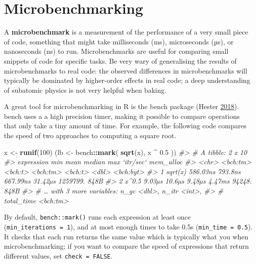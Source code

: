 \documentclass[]{book}
\newenvironment{Shaded}{\begin{snugshade}}{\end{snugshade}}
\newcommand{\CommentTok}[1]{\textcolor[rgb]{0.37,0.37,0.37}{\textit{#1}}}
\newcommand{\DecValTok}[1]{\textcolor[rgb]{0.06,0.06,0.06}{#1}}
\newcommand{\FloatTok}[1]{\textcolor[rgb]{0.06,0.06,0.06}{#1}}
\newcommand{\KeywordTok}[1]{\textcolor[rgb]{0.27,0.27,0.27}{\textbf{#1}}}
\newcommand{\NormalTok}[1]{#1}
\newcommand{\OperatorTok}[1]{\textcolor[rgb]{0.43,0.43,0.43}{\textbf{#1}}}
\newcommand{\StringTok}[1]{\textcolor[rgb]{0.5,0.5,0.5}{#1}}
\begin{document}
\hypertarget{microbenchmarking}{%
\section{Microbenchmarking}\label{microbenchmarking}}


A \textbf{microbenchmark} is a measurement of the performance of a very small piece of code, something that might take milliseconds (ms), microseconds (µs), or nanoseconds (ns) to run. Microbenchmarks are useful for comparing small snippets of code for specific tasks. Be very wary of generalising the results of microbenchmarks to real code: the observed differences in microbenchmarks will typically be dominated by higher-order effects in real code; a deep understanding of subatomic physics is not very helpful when baking.

A great tool for microbenchmarking in R is the bench package (Hester \protect\hyperlink{ref-bench}{2018}). bench uses a a high precision timer, making it possible to compare operations that only take a tiny amount of time. For example, the following code compares the speed of two approaches to computing a square root.

\begin{Shaded}
\begin{Highlighting}[]
\NormalTok{x <-}\StringTok{ }\KeywordTok{runif}\NormalTok{(}\DecValTok{100}\NormalTok{)}
\NormalTok{(lb <-}\StringTok{ }\NormalTok{bench}\OperatorTok{::}\KeywordTok{mark}\NormalTok{(}
  \KeywordTok{sqrt}\NormalTok{(x),}
\NormalTok{  x }\OperatorTok{^}\StringTok{ }\FloatTok{0.5}
\NormalTok{))}
\CommentTok{#> # A tibble: 2 x 10}
\CommentTok{#>   expression      min    mean   median     max `itr/sec` mem_alloc}
\CommentTok{#>   <chr>      <bch:tm> <bch:t> <bch:tm> <bch:t>     <dbl> <bch:byt>}
\CommentTok{#> 1 sqrt(x)    586.03ns 793.8ns 667.99ns 31.42µs  1259799.      848B}
\CommentTok{#> 2 x^0.5        9.03µs  10.6µs   9.48µs  4.47ms    94248.      848B}
\CommentTok{#> # … with 3 more variables: n_gc <dbl>, n_itr <int>,}
\CommentTok{#> #   total_time <bch:tm>}
\end{Highlighting}
\end{Shaded}

By default, \texttt{bench::mark()} runs each expression at least once (\texttt{min\_iterations\ =\ 1}), and at most enough times to take 0.5s (\texttt{min\_time\ =\ 0.5}). It checks that each run returns the same value which is typically what you when microbenchmarking; if you want to compare the speed of expressions that return different values, set \texttt{check\ =\ FALSE}.
\end{document}
